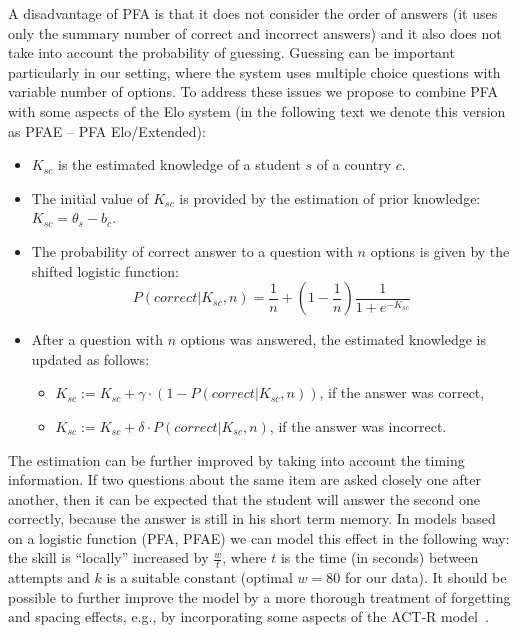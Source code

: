 \documentclass{edm_template}
\begin{document}
A disadvantage of PFA is that it does not consider the order of answers (it
uses only the summary number of correct and incorrect answers) and it also does
not take into account the probability of guessing. Guessing can be important
particularly in our setting, where the system uses multiple choice questions
with variable number of options. To address these issues we propose to combine
PFA with some aspects of the Elo system (in the following text we denote this
version as PFAE -- PFA Elo/Extended):
\begin{itemize}
\item $K_{sc}$ is the estimated knowledge of a student $s$ of a country $c$.
\item The initial value of $K_{sc}$ is provided by the estimation of prior
  knowledge: $K_{sc} = \theta_s - b_c$.
\item The probability of correct answer to a question with $n$ options is given by
  the shifted logistic function:
\[ P(\mathit{correct}|K_{sc}, n) = \frac{1}{n} + (1-\frac{1}{n})\frac{1}{1+e^{-K_{sc}}} \]
\item After a question with $n$ options was answered, the estimated
  knowledge is updated as follows:
  \begin{itemize}
  \item $K_{sc} := K_{sc} + \gamma \cdot (1-P(\mathit{correct}|K_{sc}, n))$, if
    the answer was correct,
  \item $K_{sc} := K_{sc} + \delta \cdot P(\mathit{correct}|K_{sc}, n)$, if
    the answer was incorrect.
  \end{itemize}
\end{itemize}

The estimation can be further improved by taking into account the timing
information. If two questions about the same item are asked closely one after
another, then it can be expected that the student will answer the second one
correctly, because the answer is still in his short term memory. In models
based on a logistic function (PFA, PFAE) we can model this effect in the
following way: the skill is ``locally'' increased by $\frac{w}{t}$, where $t$
is the time (in seconds) between attempts and $k$ is a suitable constant
(optimal $w = 80$ for our data). It should be possible to further improve the
model by a more thorough treatment of forgetting and spacing effects, e.g., by
incorporating some aspects of the ACT-R model~\cite{pavlik2005practice}.
\end{document}
